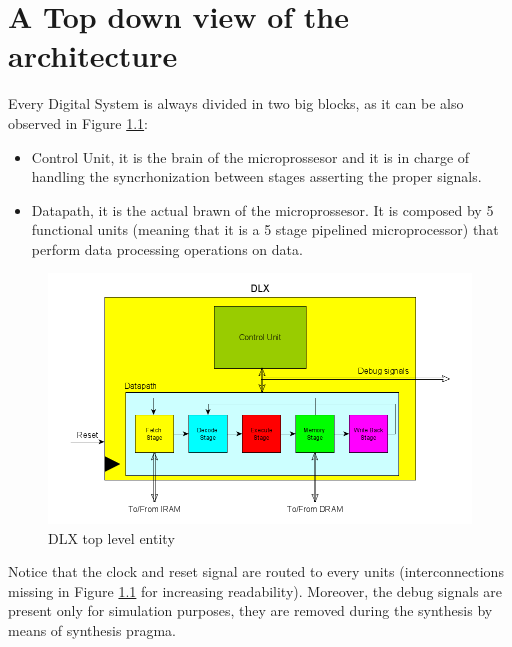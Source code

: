 \chapter{A Top down view of the architecture}
\label{architecure}
Every Digital System is always divided in two big blocks, as it can be also observed in Figure \ref{fig:dlxarch}:
\begin{itemize}
\item Control Unit, it is the brain of the microprossesor and it is in charge of handling the syncrhonization between stages asserting the proper signals.
\item Datapath, it is the actual brawn of the microprossesor. It is composed by 5 functional units (meaning that it is a 5 stage pipelined microprocessor) that perform data processing operations on data.
\end{itemize}

\begin{figure}[!htbp]
\centering
\captionsetup{justification=centering}
\includegraphics[scale=0.5,angle=0]{./chapters/figures/dlx_top.png}
\caption{DLX top level entity}
\label{fig:dlxarch}
\end{figure}

Notice that the clock and reset signal are routed to every units (interconnections missing in Figure \ref{fig:dlxarch} for increasing readability). Moreover, the debug signals are present only for simulation purposes, they are removed during the synthesis by means of synthesis pragma.

\newpage
